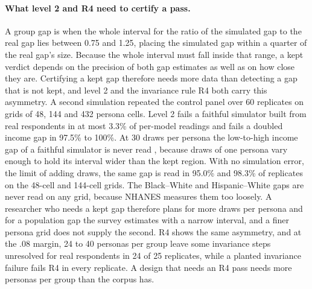 \paragraph{What level 2 and R4 need to certify a pass.}
A group gap is  when the whole interval for the ratio of the simulated gap to the real gap lies between 0.75 and 1.25, placing the simulated gap within a quarter of the real gap's size.
Because the whole interval must fall inside that range, a kept verdict depends on the precision of both gap estimates as well as on how close they are.
Certifying a kept gap therefore needs more data than detecting a gap that is not kept, and level 2 and the invariance rule R4 both carry this asymmetry.
A second simulation repeated the control panel over 60 replicates on grids of 48, 144 and 432 persona cells. %
Level 2 fails a faithful simulator built from real respondents in at most 3.3\% of per-model readings and fails a doubled income gap in 97.5\% to 100\%. %
At 30 draws per persona the low-to-high income gap of a faithful simulator is never read , because draws of one persona vary enough to hold its interval wider than the kept region. %
With no simulation error, the limit of adding draws, the same gap is read  in 95.0\% and 98.3\% of replicates on the 48-cell and 144-cell grids. %
The Black--White and Hispanic--White gaps are never read  on any grid, because NHANES measures them too loosely. %
A researcher who needs a kept gap therefore plans for more draws per persona and for a population gap the survey estimates with a narrow interval, and a finer persona grid does not supply the second.
R4 shows the same asymmetry, and at the .08 margin, 24 to 40 personas per group leave some invariance steps unresolved for real respondents in 24 of 25 replicates, while a planted invariance failure fails R4 in every replicate. %
A design that needs an R4 pass needs more personas per group than the corpus has.
